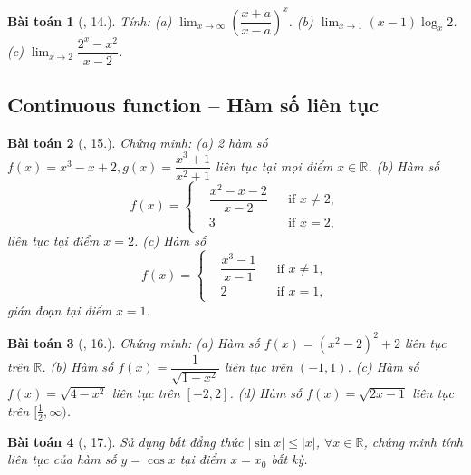 \documentclass{article}
\newtheorem{baitoan}{Bài toán}
\begin{document}
\begin{baitoan}[\cite{TLCT_dai_so_giai_tich_11}, 14.]
	Tính: (a) $\lim_{x\to\infty} \left(\dfrac{x + a}{x - a}\right)^x$. (b) $\lim_{x\to1} (x - 1)\log_x2$. (c) $\lim_{x\to2} \dfrac{2^x - x^2}{x - 2}$.
\end{baitoan}


\subsection{Continuous function -- Hàm số liên tục}

\begin{baitoan}[\cite{TLCT_dai_so_giai_tich_11}, 15.]
	Chứng minh: (a) 2 hàm số $f(x) = x^3 - x + 2,g(x) = \dfrac{x^3 + 1}{x^2 + 1}$ liên tục tại mọi điểm $x\in\mathbb{R}$. (b) Hàm số
	\begin{equation*}
		f(x) = \left\{\begin{split}
			&\dfrac{x^2 - x - 2}{x - 2}&&\mbox{if } x\ne2,\\
			&3&&\mbox{if } x = 2,
		\end{split}\right.
	\end{equation*}
	liên tục tại điểm $x = 2$. (c) Hàm số
	\begin{equation*}
		f(x) = \left\{\begin{split}
			&\dfrac{x^3 - 1}{x - 1}&&\mbox{if } x\ne1,\\
			&2&&\mbox{if } x = 1,
		\end{split}\right.
	\end{equation*}
	gián đoạn tại điểm $x = 1$.
\end{baitoan}

\begin{baitoan}[\cite{TLCT_dai_so_giai_tich_11}, 16.]
	Chứng minh: (a) Hàm số $f(x) = (x^2 - 2)^2 + 2$ liên tục trên $\mathbb{R}$. (b) Hàm số $f(x) = \dfrac{1}{\sqrt{1 - x^2}}$ liên tục trên $(-1,1)$. (c) Hàm số $f(x) = \sqrt{4 - x^2}$ liên tục trên $[-2,2]$. (d) Hàm số $f(x) = \sqrt{2x - 1}$ liên tục trên $[\frac{1}{2},\infty)$.
\end{baitoan}

\begin{baitoan}[\cite{TLCT_dai_so_giai_tich_11}, 17.]
	Sử dụng bất đẳng thức $|\sin x|\le|x|$, $\forall x\in\mathbb{R}$, chứng minh tính liên tục của hàm số $y = \cos x$ tại điểm $x = x_0$ bất kỳ.
\end{baitoan}
\end{document}
